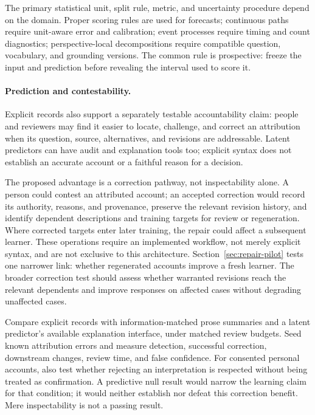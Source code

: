 \documentclass[10pt]{article}
\begin{document}
The primary statistical unit, split rule, metric, and uncertainty procedure
depend on the domain. Proper scoring rules are used for forecasts; continuous
paths require unit-aware error and calibration; event processes require timing
and count diagnostics; perspective-local decompositions require compatible
question, vocabulary, and grounding versions. The common rule is prospective:
freeze the input and prediction before revealing the interval used to score it.

\paragraph{Prediction and contestability.}
Explicit records also support a separately testable accountability claim:
people and reviewers may find it easier to locate, challenge, and correct an
attribution when its question, source, alternatives, and revisions are
addressable. Latent predictors can have audit and explanation tools too;
explicit syntax does not establish an accurate account or a faithful reason
for a decision.

The proposed advantage is a correction pathway, not inspectability alone. A
person could contest an attributed account; an accepted correction would record
its authority, reasons, and provenance, preserve the relevant revision history,
and identify dependent descriptions and training targets for review or
regeneration. Where corrected targets enter later training, the repair could
affect a subsequent learner. These operations require an implemented workflow,
not merely explicit syntax, and are not exclusive to this architecture.
Section~\ref{sec:repair-pilot} tests one narrower link: whether regenerated
accounts improve a fresh learner. The broader correction test should assess
whether warranted revisions reach the relevant dependents and improve responses
on affected cases without degrading unaffected cases.

Compare explicit records with information-matched prose
summaries and a latent predictor's available explanation interface, under
matched review budgets. Seed known attribution errors and measure detection,
successful correction, downstream changes, review time, and false confidence.
For consented personal accounts, also test whether rejecting an interpretation
is respected without being treated as confirmation. A predictive null result
would narrow the learning claim for that condition; it would neither establish
nor defeat this correction benefit. Mere inspectability is not a passing result.
\end{document}
